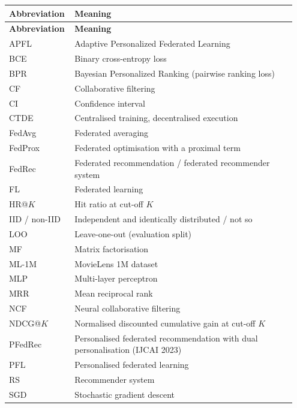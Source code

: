 \thispagestyle{plain}

\begin{longtable}{@{}p{0.2\linewidth}p{0.75\linewidth}@{}}
\textbf{Abbreviation} & \textbf{Meaning} \\
\midrule
\endfirsthead
\textbf{Abbreviation} & \textbf{Meaning} \\
\midrule
\endhead
APFL & Adaptive Personalized Federated Learning \\
BCE & Binary cross-entropy loss \\
BPR & Bayesian Personalized Ranking (pairwise ranking loss) \\
CF & Collaborative filtering \\
CI & Confidence interval \\
CTDE & Centralised training, decentralised execution \\
FedAvg & Federated averaging \\
FedProx & Federated optimisation with a proximal term \\
FedRec & Federated recommendation / federated recommender system \\
FL & Federated learning \\
HR@$K$ & Hit ratio at cut-off $K$ \\
IID / non-IID & Independent and identically distributed / not so \\
LOO & Leave-one-out (evaluation split) \\
MF & Matrix factorisation \\
ML-1M & MovieLens 1M dataset \\
MLP & Multi-layer perceptron \\
MRR & Mean reciprocal rank \\
NCF & Neural collaborative filtering \\
NDCG@$K$ & Normalised discounted cumulative gain at cut-off $K$ \\
PFedRec & Personalised federated recommendation with dual personalisation (IJCAI 2023) \\
PFL & Personalised federated learning \\
RS & Recommender system \\
SGD & Stochastic gradient descent \\
\end{longtable}
